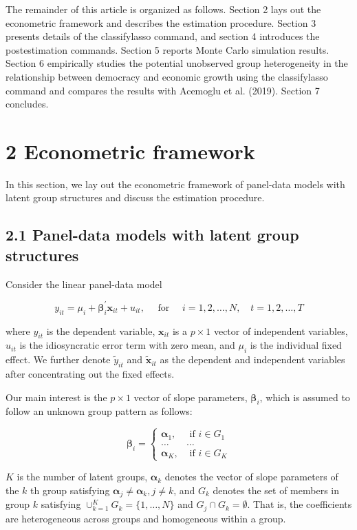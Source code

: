 \documentclass[10pt]{article}
\begin{document}
The remainder of this article is organized as follows. Section 2 lays out the econometric framework and describes the estimation procedure. Section 3 presents details of the classifylasso command, and section 4 introduces the postestimation commands. Section 5 reports Monte Carlo simulation results. Section 6 empirically studies the potential unobserved group heterogeneity in the relationship between democracy and economic growth using the classifylasso command and compares the results with Acemoglu et al. (2019). Section 7 concludes.

\section*{2 Econometric framework}
In this section, we lay out the econometric framework of panel-data models with latent group structures and discuss the estimation procedure.

\subsection*{2.1 Panel-data models with latent group structures}
Consider the linear panel-data model


\begin{equation*}
y_{i t}=\mu_{i}+\boldsymbol{\beta}_{i}^{\prime} \mathbf{x}_{i t}+u_{i t}, \quad \text { for } \quad i=1,2, \ldots, N, \quad t=1,2, \ldots, T \tag{1}
\end{equation*}


where $y_{i t}$ is the dependent variable, $\mathbf{x}_{i t}$ is a $p \times 1$ vector of independent variables, $u_{i t}$ is the idiosyncratic error term with zero mean, and $\mu_{i}$ is the individual fixed effect. We further denote $\widetilde{y}_{i t}$ and $\widetilde{\mathbf{x}}_{i t}$ as the dependent and independent variables after concentrating out the fixed effects.

Our main interest is the $p \times 1$ vector of slope parameters, $\boldsymbol{\beta}_{i}$, which is assumed to follow an unknown group pattern as follows:

\[
\boldsymbol{\beta}_{i}= \begin{cases}\boldsymbol{\alpha}_{1}, & \text { if } i \in G_{1}  \tag{2}\\ \ldots & \ldots \\ \boldsymbol{\alpha}_{K}, & \text { if } i \in G_{K}\end{cases}
\]

$K$ is the number of latent groups, $\boldsymbol{\alpha}_{k}$ denotes the vector of slope parameters of the $k$ th group satisfying $\boldsymbol{\alpha}_{j} \neq \boldsymbol{\alpha}_{k}, j \neq k$, and $G_{k}$ denotes the set of members in group $k$ satisfying $\cup_{k=1}^{K} G_{k}=\{1, \ldots, N\}$ and $G_{j} \cap G_{k}=\emptyset$. That is, the coefficients are heterogeneous across groups and homogeneous within a group.
\end{document}
